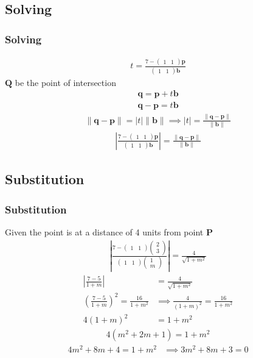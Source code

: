 \documentclass{beamer}
\providecommand{\brak}[1]{\ensuremath{\left(#1\right)}}
\theoremstyle{remark}
\providecommand{\norm}[1]{\lVert#1\rVert}
\newcommand{\myvec}[1]{\ensuremath{\begin{pmatrix}#1\end{pmatrix}}}
\let\vec\mathbf
\numberwithin{equation}{section}
\begin{document}
\subsection{Solving}
\begin{frame}
\frametitle{Solving}
\begin{align}
t=\frac{7-\myvec{1&1}\vec{p}}{\myvec{1&1}\vec{b}}
\end{align}
$\vec{Q}$ be the point of intersection
\begin{align}
\vec{q}=\vec{p}+t\vec{b} \\
\vec{q}-\vec{p}=t\vec{b} 
\end{align}
\begin{align}
\norm{\vec{q}-\vec{p}}=|t|\norm{\vec{b}} 
\implies |t|=\frac{\norm{\vec{q}-\vec{p}}}{\norm{\vec{b}}} 
\end{align}
\begin{align}
\left|  \frac{7-\myvec{1&1}\vec{p}}{\myvec{1&1}\vec{b}} \right|=\frac{\norm{\vec{q}-\vec{p}}}{\norm{\vec{b}}}
\end{align}
\end{frame}
\subsection{Substitution}
\begin{frame}
\frametitle{Substitution}
Given the point is at a distance of 4 units from point $\vec{P}$
\begin{align}
 \left|  \frac{7-\myvec{1&1}\myvec{2\\3}}{\myvec{1&1}\myvec{1\\m}} \right| =\frac{4}{\sqrt{1+m^2}} 
\end{align}
\begin{align}
\left|\frac{7-5}{1+m}\right|&=\frac{4}{\sqrt{1+m^2}} \\
\brak{\frac{7-5}{1+m}}^2=\frac{16}{1+m^2} &\implies \frac{4}{\brak{1+m}^2}=\frac{16}{1+m^2} \\
4\brak{1+m}^2&=1+m^2 
\end{align}
\begin{align}
4\brak{m^2+2m+1}=1+m^2 
\end{align}
\begin{align}
4m^2+8m+4=1+m^2 &\implies 3m^2 + 8m + 3 = 0 
\end{align}
\end{frame}
\end{document}
